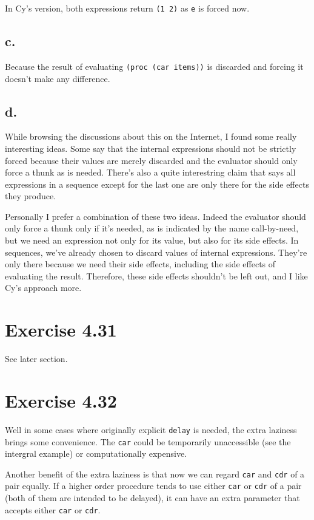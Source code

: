 \documentclass[../main.tex]{subfiles}
\begin{document}
In Cy's version, both expressions return \lstinline{(1 2)} as \lstinline{e} is forced now.

\subsection{c.}

Because the result of evaluating \lstinline{(proc (car items))} is discarded and forcing it doesn't make any difference.

\subsection{d.}

While browsing the discussions about this on the Internet, I found some really interesting ideas. Some say that the internal expressions should not be strictly forced because their values are merely discarded and the evaluator should only force a thunk as is needed. There's also a quite interestring claim that says all expressions in a sequence except for the last one are only there for the side effects they produce.

Personally I prefer a combination of these two ideas. Indeed the evaluator should only force a thunk only if it's needed, as is indicated by the name call-by-need, but we need an expression not only for its value, but also for its side effects. In sequences, we've already chosen to discard values of internal expressions. They're only there because we need their side effects, including the side effects of evaluating the result. Therefore, these side effects shouldn't be left out, and I like Cy's approach more.

\section{Exercise 4.31}

See later section.

\section{Exercise 4.32}

Well in some cases where originally explicit \lstinline{delay} is needed, the extra laziness brings some convenience. The \lstinline{car} could be temporarily unaccessible (see the intergral example) or computationally expensive.

Another benefit of the extra laziness is that now we can regard \lstinline{car} and \lstinline{cdr} of a pair equally. If a higher order procedure tends to use either \lstinline{car} or \lstinline{cdr} of a pair (both of them are intended to be delayed), it can have an extra parameter that accepts either \lstinline{car} or \lstinline{cdr}.
\end{document}
